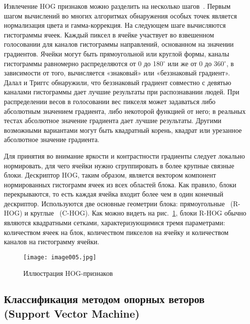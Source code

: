 Извлечение HOG признаков можно разделить на несколько шагов~\cite{seven}. Первым шагом вычислений во многих алгоритмах обнаружения особых точек является нормализация цвета и гамма-коррекция. На следующем шаге вычисляются гистограммы ячеек. Каждый пиксел в ячейке участвует во взвешенном голосовании для каналов гистограммы направлений, основанном на значении градиентов. Ячейки могут быть прямоугольной или круглой формы, каналы гистограммы равномерно распределяются от 0 до 180$^{\circ}$ или же от 0 до 360$^{\circ}$, в зависимости от того, вычисляется «знаковый» или «беззнаковый градиент». Далал и Триггс обнаружили, что беззнаковый градиент совместно с девятью каналами гистограммы дает лучшие результаты при распознавании людей. При распределении весов в голосовании вес пикселя может задаваться либо абсолютным значением градиента, либо некоторой функцией от него; в реальных тестах абсолютное значение градиента дает лучшие результаты. Другими возможными вариантами могут быть квадратный корень, квадрат или урезанное абсолютное значение градиента.

Для принятия во внимание яркости и контрастности градиенты следует локально нормировать, для чего ячейки нужно сгруппировать в более крупные связные блоки. Дескриптор HOG, таким образом, является вектором компонент нормированных гистограмм ячеек из всех областей блока. Как правило, блоки перекрываются, то есть каждая ячейка входит более чем в один конечный дескриптор. Используются две основные геометрии блока: прямоугольные ~(R-HOG) и круглые ~(C-HOG). Как можно видеть на рис.~\ref{fig:image005}, блоки R-HOG обычно являются квадратными сетками, характеризующимися тремя параметрами: количеством ячеек на блок, количеством пикселов на ячейку и количеством каналов на гистограмму ячейки.

\begin{figure}[htbp]
\centering
\texttt{[image: image005.jpg]}
\caption{Иллюстрация HOG-признаков~\cite{eight}}%
\label{fig:image005}
\end{figure}

\subsection{Классификация методом опорных веторов (Support Vector Machine)}

